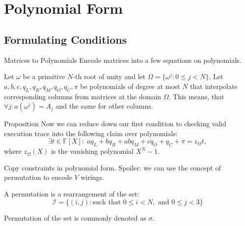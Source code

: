 \documentclass{zkdl-presentation-template}
\begin{document}
    \section{Polynomial Form}
    \subsection{Formulating Conditions}
    \begin{frame}{Matrices to Polynomials}
        Encode matrices into a few equations on polynomials. 

        Let $\omega$ be a primitive $N$-th root of unity and let $\Omega = \{\omega^j: 0 \le j < N\}$. 
        Let \(a, b, c, q_L, q_R, q_M, q_O, q_C, \pi\) be polynomials of degree at most $N$ that
        interpolate corresponding columns from matrices at the domain $\Omega$. This means,
        that \(\forall j: a(\omega^j) = A_j\) and the same for other columns.

        \begin{block}{Proposition}
            Now we can reduce down our first condition to checking valid execution trace
            into the following claim over polynomials:
            \[\exists t \in \mathbb{F}[X]: \; aq_L + bq_R + abq_M + cq_O + q_C + \pi = z_{\Omega} t,\]
            where $z_{\Omega}(X)$ is the vanishing polynomial $X^N - 1$.
        \end{block}
    \end{frame}

    \begin{frame} {Copy constraints in polynomial form.}
        Spoiler: we can use the concept of permutation to encode $V$ wirings.
    
        A permutation is a rearrangement of the set: 
        \[\mathcal{I} = \{(i, j) : \text{such that } 0 \leq i < N, \text{ and } 0 \leq j < 3\}\]

        Permutation of the set is commonly denoted as $\sigma$.
    \end{frame}
\end{document}
